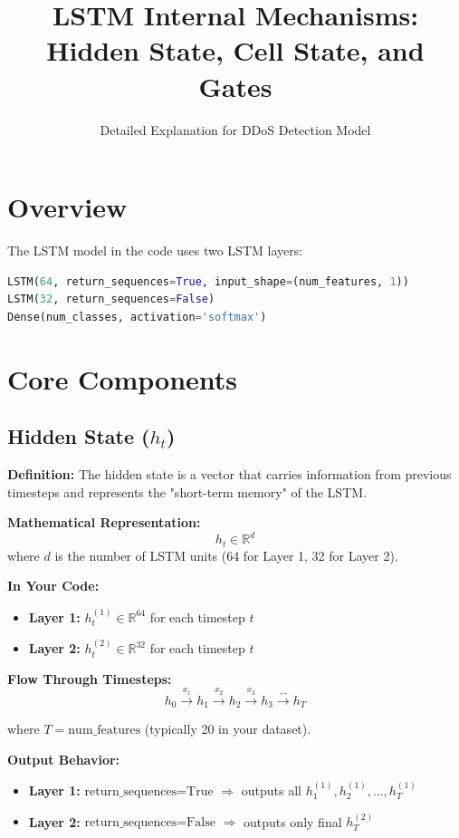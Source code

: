 \documentclass[12pt]{article}
\title{LSTM Internal Mechanisms: Hidden State, Cell State, and Gates}
\author{Detailed Explanation for DDoS Detection Model}
\date{}
\begin{document}
\maketitle

\section{Overview}

The LSTM model in the code uses two LSTM layers:
\begin{lstlisting}[language=Python, basicstyle=\ttfamily]
LSTM(64, return_sequences=True, input_shape=(num_features, 1))
LSTM(32, return_sequences=False)
Dense(num_classes, activation='softmax')
\end{lstlisting}

\section{Core Components}

\subsection{Hidden State ($h_t$)}

\textbf{Definition:} The hidden state is a vector that carries information from previous timesteps and represents the "short-term memory" of the LSTM.

\textbf{Mathematical Representation:}
\[
h_t \in \mathbb{R}^d
\]
where $d$ is the number of LSTM units (64 for Layer 1, 32 for Layer 2).

\textbf{In Your Code:}
\begin{itemize}
    \item \textbf{Layer 1:} $h_t^{(1)} \in \mathbb{R}^{64}$ for each timestep $t$
    \item \textbf{Layer 2:} $h_t^{(2)} \in \mathbb{R}^{32}$ for each timestep $t$
\end{itemize}

\textbf{Flow Through Timesteps:}
\[
h_0 \xrightarrow{x_1} h_1 \xrightarrow{x_2} h_2 \xrightarrow{x_3} h_3 \xrightarrow{\cdots} h_T
\]

where $T = \text{num\_features}$ (typically 20 in your dataset).

\textbf{Output Behavior:}
\begin{itemize}
    \item \textbf{Layer 1:} $\text{return\_sequences=True}$ $\Rightarrow$ outputs all $h_1^{(1)}, h_2^{(1)}, \ldots, h_T^{(1)}$
    \item \textbf{Layer 2:} $\text{return\_sequences=False}$ $\Rightarrow$ outputs only final $h_T^{(2)}$
\end{itemize}
\end{document}
